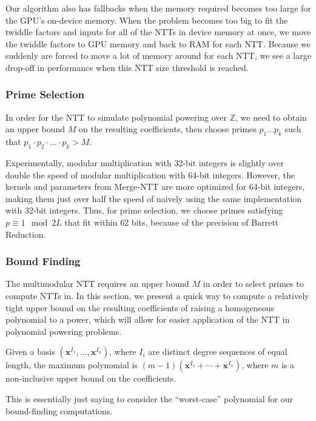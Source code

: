Our algorithm also has fallbacks when the memory required becomes too large for the 
GPU's on-device memory.
When the problem becomes too big to fit the twiddle factors and 
inputs for all of the NTTs in device memory at once, 
we move the twiddle factors to GPU memory and 
back to RAM for each NTT. Because we suddenly are forced to move a lot 
of memory around for each NTT, we see a large drop-off in 
performance when this NTT size threshold is reached. 


\subsubsection{Prime Selection}
In order for the NTT to simulate polynomial powering over $\mathbb{Z}$, 
we need to obtain an upper bound $M$ 
on the resulting coefficients, then 
choose primes $p_1 \dots p_k$ such 
that $p_1 \cdot p_2 \cdot ... \cdot p_k > M$.

Experimentally, modular multiplication with 32-bit integers 
is slightly over double the speed of modular 
multiplication with 64-bit integers. 
However, the kernels and parameters from Merge-NTT are more 
optimized for 64-bit integers, making them just over half the
speed of naively using the same implementation with 32-bit 
integers. Thus, for prime selection, 
we choose primes satisfying $p \equiv 1 \mod 2L$ that fit 
within 62 bits, because of the precision of Barrett Reduction.

\subsubsection{Bound Finding}
The multimodular NTT requires an upper bound $M$ in order to select primes 
to compute NTTs in. In this section, we present a quick way to compute a 
relatively tight upper bound on the resulting 
coefficients of raising a homogeneous polynomial to a power, which
will allow for easier application of the NTT in polynomial powering
problems.

\begin{defn}
    Given a basis $(\mathbf{x}^{I_1}, \dots, \mathbf{x}^{I_n})$, where $I_i$ are distinct degree sequences of equal length, the maximum polynomial is $(m - 1)(\mathbf{x}^{I_1} + \cdots + \mathbf{x}^{I_n})$, where $m$ is a non-inclusive upper bound on the coefficients.
\end{defn}

This is essentially just saying to consider the ``worst-case'' polynomial 
for our bound-finding computations.


